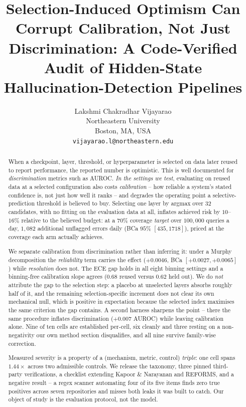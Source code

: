 \documentclass{article}
\title{Selection-Induced Optimism Can Corrupt Calibration, Not Just Discrimination:
A Code-Verified Audit of Hidden-State Hallucination-Detection Pipelines}
\author{%
  Lakshmi Chakradhar Vijayarao \\
  Northeastern University \\
  Boston, MA, USA \\
  \texttt{vijayarao.l@northeastern.edu} \\
}
\begin{document}
\maketitle

\begin{abstract}
When a checkpoint, layer, threshold, or hyperparameter is selected on data
later reused to report performance, the reported number is optimistic. This is
well documented for \emph{discrimination} metrics such as AUROC. \emph{In the
settings we test}, evaluating on reused data at a selected configuration also
costs \emph{calibration} -- how reliable a system's stated confidence is, not
just how well it ranks -- and degrades the operating point a
selective-prediction threshold is believed to buy. Selecting one layer by
argmax over $32$ candidates, with no fitting on the evaluation data at all,
inflates achieved risk by $10$--$16\%$ relative to the believed budget: at a
$70\%$ coverage \emph{target} over $100{,}000$ queries a day, $1{,}082$
additional unflagged errors daily (BCa $95\%$ $[435,1718]$), priced at the
coverage each arm actually achieves.

We separate calibration from discrimination rather than inferring it: under a
Murphy decomposition the \emph{reliability} term carries the effect
($+0.0046$, BCa $[+0.0027,+0.0065]$) while \emph{resolution} does not. The ECE
gap holds in all eight binning settings and a binning-free calibration slope
agrees ($0.68$ reused versus $0.62$ held out). We do \emph{not} attribute the
gap to the selection step: a placebo at unselected layers absorbs roughly half
of it, and the remaining selection-specific increment does not clear its own
mechanical null, which is positive in expectation because the selected index
maximises the same criterion the gap contains. A second harness sharpens the
point -- there the same procedure inflates discrimination ($+0.007$ AUROC)
while leaving calibration alone. Nine of ten cells are established per-cell,
six cleanly and three resting on a non-negativity our own method section
disqualifies, and all nine survive family-wise correction.

Measured severity is a property of a (mechanism, metric, control)
\emph{triple}: one cell spans $1.44\times$ across two admissible controls. We
release the taxonomy, three pinned third-party verifications, a checklist
extending Kapoor \& Narayanan and REFORMS, and a negative result -- a regex
scanner automating four of its five items finds zero true positives across
seven repositories and misses both leaks it was built to catch. Our object of
study is the evaluation protocol, not the model.
\end{abstract}
\end{document}
